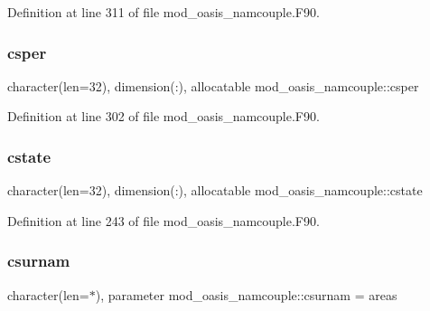 Definition at line 311 of file mod\+\_\+oasis\+\_\+namcouple.\+F90.

\mbox{\label{namespacemod__oasis__namcouple_ab91b4542e45eb52edda3b841dcfba553}} 
\subsubsection{\texorpdfstring{csper}{csper}}
{\footnotesize\ttfamily character(len=32), dimension(\+:), allocatable mod\+\_\+oasis\+\_\+namcouple\+::csper\hspace{0.3cm}{\ttfamily [private]}}



Definition at line 302 of file mod\+\_\+oasis\+\_\+namcouple.\+F90.

\mbox{\label{namespacemod__oasis__namcouple_ac44c9e1c2c944879f81252fc1850ee19}} 
\subsubsection{\texorpdfstring{cstate}{cstate}}
{\footnotesize\ttfamily character(len=32), dimension(\+:), allocatable mod\+\_\+oasis\+\_\+namcouple\+::cstate\hspace{0.3cm}{\ttfamily [private]}}



Definition at line 243 of file mod\+\_\+oasis\+\_\+namcouple.\+F90.

\mbox{\label{namespacemod__oasis__namcouple_aeda2e47deb9277960f4c93a6a13b0154}} 
\subsubsection{\texorpdfstring{csurnam}{csurnam}}
{\footnotesize\ttfamily character(len=$\ast$), parameter mod\+\_\+oasis\+\_\+namcouple\+::csurnam = \textquotesingle{}areas\textquotesingle{}\hspace{0.3cm}{\ttfamily [private]}}



